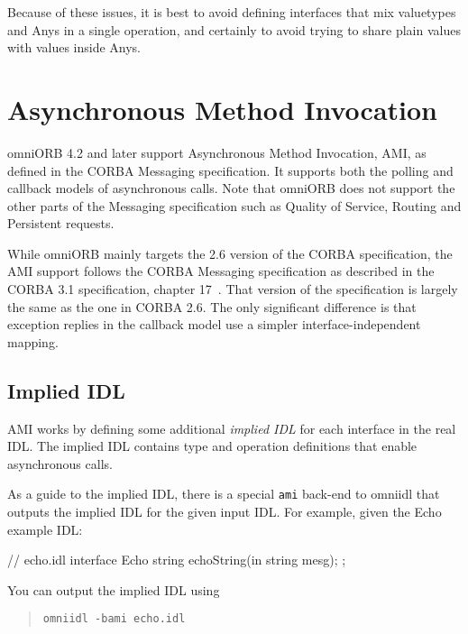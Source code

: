 \documentclass[11pt,oneside,a4paper]{book}
\newcommand{\cmdline}[1]{\texttt{#1}}
\newcommand{\term}[1]{\textit{#1}}
\begin{document}
Because of these issues, it is best to avoid defining interfaces that
mix valuetypes and Anys in a single operation, and certainly to avoid
trying to share plain values with values inside Anys.



\chapter{Asynchronous Method Invocation}
\label{chap:ami}

omniORB 4.2 and later support Asynchronous Method Invocation, AMI, as
defined in the CORBA Messaging specification. It supports both the
polling and callback models of asynchronous calls. Note that omniORB
does not support the other parts of the Messaging specification such
as Quality of Service, Routing and Persistent requests.

While omniORB mainly targets the 2.6 version of the CORBA
specification, the AMI support follows the CORBA Messaging
specification as described in the CORBA 3.1 specification, chapter
17~\cite{corba31-spec}. That version of the specification is largely
the same as the one in CORBA 2.6. The only significant difference is
that exception replies in the callback model use a simpler
interface-independent mapping.

\section{Implied IDL}

AMI works by defining some additional \term{implied IDL} for each
interface in the real IDL. The implied IDL contains type and
operation definitions that enable asynchronous calls.

As a guide to the implied IDL, there is a special \cmdline{ami}
back-end to omniidl that outputs the implied IDL for the given input
IDL. For example, given the Echo example IDL:

\begin{idllisting}
// echo.idl
interface Echo {
  string echoString(in string mesg);
};
\end{idllisting}

\noindent You can output the implied IDL using

\begin{quote}
\cmdline{omniidl -bami echo.idl}
\end{quote}
\end{document}
